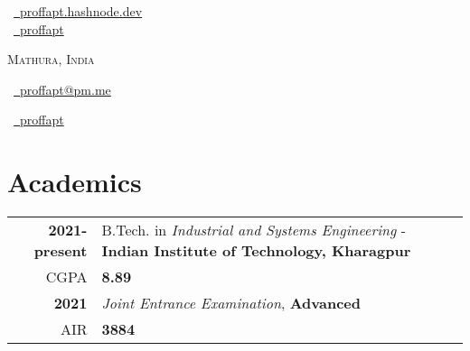 \documentclass[a4paper,10pt]{extarticle} %
\begin{document}
\pagestyle{empty} %

\begin{multicols}{3}

\normalsize  \faGlobe\ {\href{https://proffapt.hashnode.dev/}{\  proffapt.hashnode.dev}}\\
\normalsize \faGithub\ {\href{https://github.com/proffapt}{\  proffapt}}\\
\columnbreak
\normalsize\par{\centering{\huge\textsc{\textcolor{primary}{Arpit Bhardwaj}}}\par} 
\par{\centering\normalsize {\textsc{Mathura, India}}\hfill\par}
\columnbreak
\raggedright\hfill\normalsize \faEnvelope\ {\href{mailto:proffapt@pm.me}{\  proffapt@pm.me}}\\
\raggedright\hfill\normalsize \faLinkedinSquare\ {\href{https://www.linkedin.com/in/proffapt}{\  proffapt}}\\
\end{multicols}
\vspace{-0.4 cm}

\section{\textcolor{primary}{Academics}}
\vspace{+0.1cm}

\begin{tabular}{r|p{17.5cm}}	

 \textbf{2021-present} & B.Tech. in \textit{Industrial and Systems Engineering} - \textbf{Indian Institute of Technology, Kharagpur}\\
 \hfill CGPA & \textbf{8.89}\\
 \textbf{2021} & \textit{Joint Entrance Examination}, \textbf{Advanced}\\
 \hfill AIR & \textbf{3884}\\
 
\end{tabular}
\end{document}
